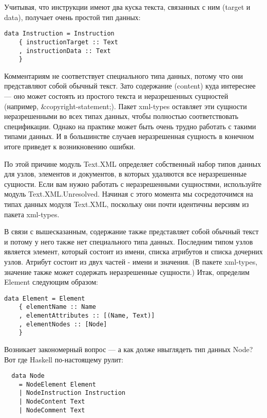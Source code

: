 Учитывая, что инструкции имеют два куска текста, связанных с ним (target и data), получает очень простой тип данных:

\begin{lstlisting}
data Instruction = Instruction
    { instructionTarget :: Text
    , instructionData :: Text
    }
\end{lstlisting}

Комментариям не соответствует специального типа данных, потому что они представляют собой обычный текст. Зато содержание (content) куда интереснее --- оно может состоять из простого текста и неразрешенных сущностей (например, \&copyright-statement;). Пакет xml-types оставляет эти сущности неразрешенными во всех типах данных, чтобы полностью соответствовать спецификации. Однако на практике может быть очень трудно работать с такими типами данных. И в большинстве случаев неразрешенная сущность в конечном итоге приведет к возникновению ошибки.

По этой причине модуль Text.XML определяет собственный набор типов данных для узлов, элементов и документов, в которых удаляются все неразрешенные сущности. Если вам нужно работать с неразрешенными сущностями, используйте модуль Text.XML.Unresolved. Начиная с этого момента мы сосредоточимся на типах данных модуля Text.XML, поскольку они почти идентичны версиям из пакета xml-types.

В связи с вышесказанным, содержание также представляет собой обычный текст и потому у него также нет специального типа данных. Последним типом узлов является элемент, который состоит из имени, списка атрибутов и списка дочерних узлов. Атрибут состоит из двух частей - имени и значения. (В пакете xml-types, значение также может содержать неразрешенные сущности.) Итак, определим Element следующим образом:

\begin{lstlisting}
data Element = Element
    { elementName :: Name
    , elementAttributes :: [(Name, Text)]
    , elementNodes :: [Node]
    }
\end{lstlisting}

Возникает закономерный вопрос --- а как долже нвыглядеть тип данных Node? Вот где Haskell по-настоящему рулит: %

\begin{lstlisting}
  data Node
    = NodeElement Element
    | NodeInstruction Instruction
    | NodeContent Text
    | NodeComment Text
\end{lstlisting}

